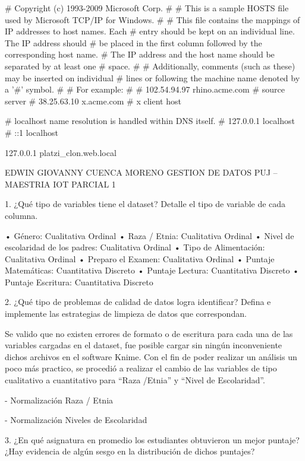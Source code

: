 # Copyright (c) 1993-2009 Microsoft Corp.
#
# This is a sample HOSTS file used by Microsoft TCP/IP for Windows.
#
# This file contains the mappings of IP addresses to host names. Each
# entry should be kept on an individual line. The IP address should
# be placed in the first column followed by the corresponding host name.
# The IP address and the host name should be separated by at least one
# space.
#
# Additionally, comments (such as these) may be inserted on individual
# lines or following the machine name denoted by a '#' symbol.
#
# For example:
#
#      102.54.94.97     rhino.acme.com          # source server
#       38.25.63.10     x.acme.com              # x client host

# localhost name resolution is handled within DNS itself.
#	127.0.0.1       localhost
#	::1             localhost

127.0.0.1 platzi_clon.web.local

EDWIN GIOVANNY CUENCA MORENO
GESTION DE DATOS
PUJ – MAESTRIA IOT
PARCIAL 1

1.	¿Qué tipo de variables tiene el dataset? Detalle el tipo de variable de cada columna.

•	Género: Cualitativa Ordinal
•	Raza / Etnia: Cualitativa Ordinal
•	Nivel de escolaridad de los padres: Cualitativa Ordinal
•	Tipo de Alimentación: Cualitativa Ordinal
•	Preparo el Examen: Cualitativa Ordinal
•	Puntaje Matemáticas: Cuantitativa Discreto
•	Puntaje Lectura: Cuantitativa Discreto
•	Puntaje Escritura: Cuantitativa Discreto

2.	¿Qué tipo de problemas de calidad de datos logra identificar? Defina e implemente las estrategias de limpieza de datos que correspondan.

Se valido que no existen errores de formato o de escritura para cada una de las variables cargadas en el dataset, fue posible cargar sin ningún inconveniente dichos archivos en el software Knime. Con el fin de poder realizar un análisis un poco más practico, se procedió a realizar el cambio de las variables de tipo cualitativo a cuantitativo para “Raza /Etnia” y “Nivel de Escolaridad”.

-	Normalización Raza / Etnia
 

-	Normalización Niveles de Escolaridad
 









3.	¿En qué asignatura en promedio los estudiantes obtuvieron un mejor puntaje? ¿Hay evidencia de algún sesgo en la distribución de dichos puntajes?


